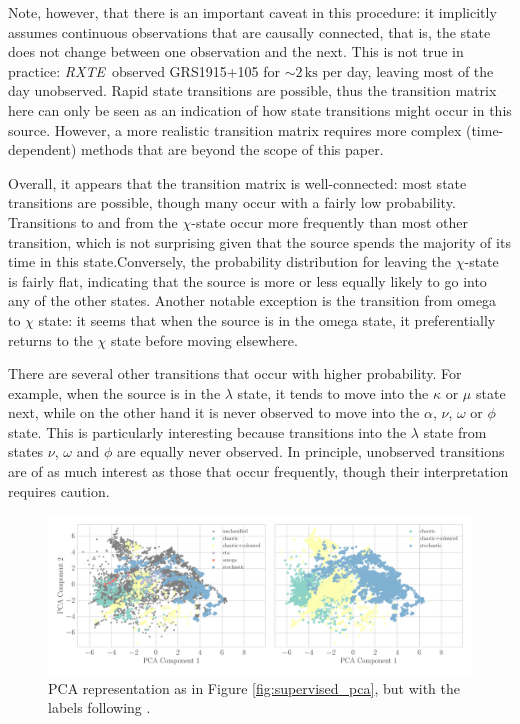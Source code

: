 \documentclass[12pt]{emulateapj}
\newcommand{\project}[1]{\textsl{#1}}
\newcommand{\rxte}{\project{RXTE}}
\begin{document}
Note, however, that there is an important caveat in this procedure: it implicitly assumes continuous observations that are causally connected, that is, the state 
does not change between one observation and the next. This is not true in practice: \rxte\ observed GRS1915+105 for $\sim 2\,\mathrm{ks}$ per day, leaving most 
of the day unobserved. Rapid state transitions are possible, thus the transition matrix here can only be seen as an indication of how state transitions might occur 
in this source. However, a more realistic transition matrix requires more complex (time-dependent) methods that are beyond the scope of this paper.

Overall, it appears that the transition matrix is well-connected: most state transitions are possible, though many occur with a fairly low probability.
Transitions to and from the $\chi$-state occur more frequently than most other transition, which is not surprising given that the source spends the majority of its time 
in this state.Conversely, the probability distribution for leaving the $\chi$-state is fairly flat, indicating that the source is more or less equally likely to go into any 
of the other states. Another notable exception is the transition from omega to $\chi$ state: it seems that when the source is in the omega state, it preferentially 
returns to the $\chi$ state before moving elsewhere. 

There are several other transitions that occur with higher probability. For example, when the source is in 
the $\lambda$ state, it tends to move into the $\kappa$ or $\mu$ state next, while on the other hand it is never observed to move into the $\alpha$, $\nu$, 
$\omega$ or $\phi$ state. This is particularly interesting because transitions into the $\lambda$ state from states $\nu$, $\omega$ and $\phi$ are equally 
never observed. In principle, unobserved transitions are of as much interest as those that occur frequently, though their interpretation requires caution. 

\begin{figure}[htbp]
\begin{center}
\includegraphics[width=\textwidth]{grs1915_supervised_phys_features_pca.pdf}
\caption{PCA representation as in Figure \ref{fig:supervised_pca}, but with the labels following \citet{harikrishnan2011}.} 
\label{fig:pca_physical}
\end{center}
\end{figure}
\end{document}
